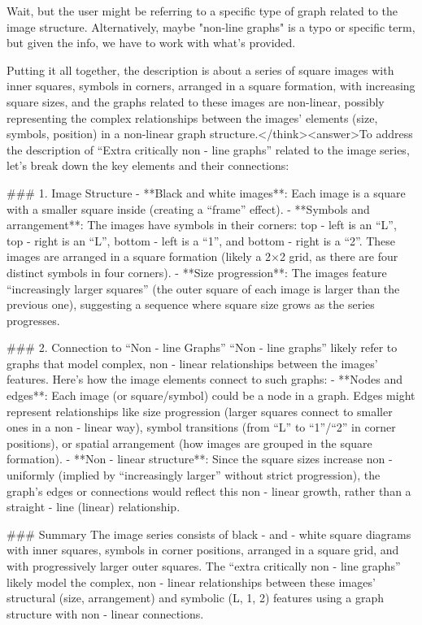 Wait, but the user might be referring to a specific type of graph related to the image structure. Alternatively, maybe "non-line graphs" is a typo or specific term, but given the info, we have to work with what's provided.

Putting it all together, the description is about a series of square images with inner squares, symbols in corners, arranged in a square formation, with increasing square sizes, and the graphs related to these images are non-linear, possibly representing the complex relationships between the images' elements (size, symbols, position) in a non-linear graph structure.</think><answer>To address the description of “Extra critically non - line graphs” related to the image series, let’s break down the key elements and their connections:  

### 1. Image Structure  
- **Black and white images**: Each image is a square with a smaller square inside (creating a “frame” effect).  
- **Symbols and arrangement**: The images have symbols in their corners: top - left is an “L”, top - right is an “L”, bottom - left is a “1”, and bottom - right is a “2”. These images are arranged in a square formation (likely a 2×2 grid, as there are four distinct symbols in four corners).  
- **Size progression**: The images feature “increasingly larger squares” (the outer square of each image is larger than the previous one), suggesting a sequence where square size grows as the series progresses.    

### 2. Connection to “Non - line Graphs”  
“Non - line graphs” likely refer to graphs that model complex, non - linear relationships between the images’ features. Here’s how the image elements connect to such graphs:  
- **Nodes and edges**: Each image (or square/symbol) could be a node in a graph. Edges might represent relationships like size progression (larger squares connect to smaller ones in a non - linear way), symbol transitions (from “L” to “1”/“2” in corner positions), or spatial arrangement (how images are grouped in the square formation).  
- **Non - linear structure**: Since the square sizes increase non - uniformly (implied by “increasingly larger” without strict progression), the graph’s edges or connections would reflect this non - linear growth, rather than a straight - line (linear) relationship.    

### Summary  
The image series consists of black - and - white square diagrams with inner squares, symbols in corner positions, arranged in a square grid, and with progressively larger outer squares. The “extra critically non - line graphs” likely model the complex, non - linear relationships between these images’ structural (size, arrangement) and symbolic (L, 1, 2) features using a graph structure with non - linear connections.  

